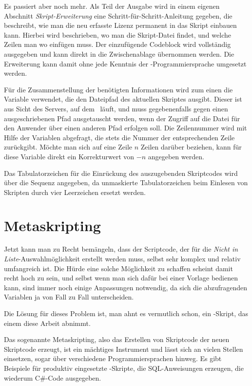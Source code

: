 Es passiert aber noch mehr. Als Teil der Ausgabe wird in einem eigenen Abschnitt \emph{Skript-Erweiterung} eine Schritt-für-Schritt-Anleitung gegeben, die beschreibt, wie man die neu erfasste Lizenz permanent in das Skript einbauen kann. Hierbei wird beschrieben, wo man die Skript-Datei findet, und welche Zeilen man wo einfügen muss. Der einzufügende Codeblock wird vollständig ausgegeben und kann direkt in die Zwischenablage übernommen werden. Die Erweiterung kann damit ohne jede Kenntnis der \FPZb-Programmiersprache umgesetzt werden.

Für die Zusammenstellung der benötigten Informationen wird zum einen die Variable  verwendet, die den Dateipfad des aktuellen Skriptes ausgibt. Dieser ist aus Sicht des Servers, auf dem \FPZ\ läuft, und muss gegebenenfalls gegen einen ausgeschriebenen Pfad ausgetauscht werden, wenn der Zugriff auf die Datei für den Anwender über einen anderen Pfad erfolgen soll. Die Zeilennummer wird mit Hilfe der Variablen  abgefragt, die stets die Nummer der entsprechenden Zeile zurückgibt. Möchte man sich auf eine Zeile $n$ Zeilen darüber beziehen, kann für diese Variable direkt ein Korrekturwert von $-n$ angegeben werden.

Das Tabulatorzeichen für die Einrückung des auszugebenden Skriptcodes wird über die Sequenz  angegeben, da unmaskierte Tabulatorzeichen beim Einlesen von Skripten durch vier Leerzeichen ersetzt werden.

\section{Metaskripting}\label{Metaskripting}
Jetzt kann man zu Recht bemängeln, dass der Scriptcode, der für die \emph{Nicht in Liste}-Auswahlmöglichkeit erstellt werden muss, selbst sehr komplex und relativ umfangreich ist. Die Hürde eine solche Möglichkeit zu schaffen scheint damit recht hoch zu sein, und selbst wenn man sich dafür bei einer Vorlage bedienen kann, sind immer noch einige Anpassungen notwendig, da sich die abzufragenden Variablen ja von Fall zu Fall unterscheiden.

Die Lösung für dieses Problem ist, man ahnt es vermutlich schon, ein \FPZb-Skript, das einem diese Arbeit abnimmt.

Das sogenannte Metaskripting, also das Erstellen von Skriptcode der neuen Skriptcode erzeugt, ist ein mächtiges Instrument und lässt sich an vielen Stellen einsetzen, sogar über verschiedene Programmiersprachen hinweg. Es gibt Beispiele für produktiv eingesetzte \FPZb-Skripte, die SQL-Anweisungen erzeugen, die wiederum C\#-Code ausgegeben.

